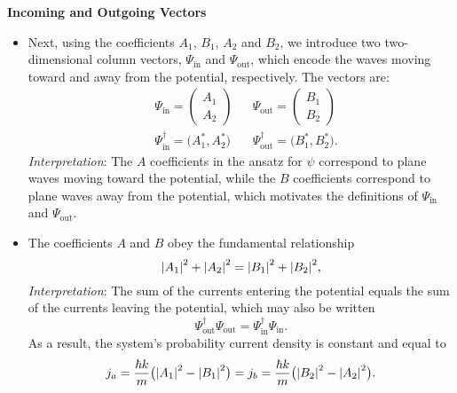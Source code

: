 \documentclass[11pt, a4paper]{article}
\begin{document}
\textbf{Incoming and Outgoing Vectors}
\begin{itemize}
    \item Next, using the coefficients $ A_{1} $, $ B_{1} $, $ A_{2} $ and $ B_{2} $, we introduce two two-dimensional column vectors, $ \Psi_{\text{in}} $ and $ \Psi_{\text{out}} $, which encode the waves moving toward and away from the potential, respectively. The vectors are:
    \begin{align*}
        & \Psi_{\text{in}} = 
        \begin{pmatrix}
            A_{1}\\
            A_{2}
        \end{pmatrix}
        && \Psi_{\text{out}} = 
        \begin{pmatrix}
            B_{1} \\
            B_{2}
        \end{pmatrix}\\
        & \Psi_{\text{in}}^{\dagger} = \big( A_{1}^{*}, A_{2}^{*} \big)
        && \Psi_{\text{out}}^{\dagger} = \big( B_{1}^{*}, B_{2}^{*} \big).
    \end{align*}
    \textit{Interpretation}: The $ A $ coefficients in the ansatz for $ \psi $ correspond to plane waves moving toward the potential, while the $ B $ coefficients correspond to plane waves away from the potential, which motivates the definitions of $ \Psi_{\text{in}} $ and $ \Psi_{\text{out}} $.

    \item The coefficients $ A $ and $ B $ obey the fundamental relationship
    \begin{equation*}
        \abs{A_{1}}^{2} + \abs{A_{2}}^{2} = \abs{B_{1}}^{2} + \abs{B_{2}}^{2},
    \end{equation*}
    \textit{Interpretation}: The sum of the currents entering the potential equals the sum of the currents leaving the potential, which may also be written
    \begin{equation*}
        \Psi_{\text{out}}^{\dagger} \Psi_{\text{out}} = \Psi_{\text{in}}^{\dagger} \Psi_{\text{in}}.
    \end{equation*}
    As a result, the system's probability current density is constant and equal to
    \begin{equation*}
        j_{a} = \frac{\hbar k}{m} \big( \abs{A_{1}}^{2} - \abs{B_{1}}^{2} \big) = j_{b} = \frac{\hbar k}{m} \big( \abs{B_{2}}^{2} - \abs{A_{2}}^{2} \big).
    \end{equation*}
    
\end{itemize}
\end{document}
